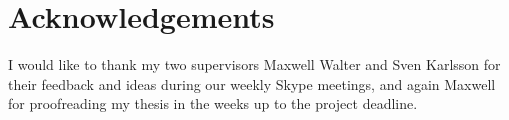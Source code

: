 \chapter{Acknowledgements}
I would like to thank my two supervisors Maxwell Walter and Sven
Karlsson for their feedback and ideas during our weekly Skype
meetings, and again Maxwell for proofreading my thesis in the weeks up
to the project deadline.
